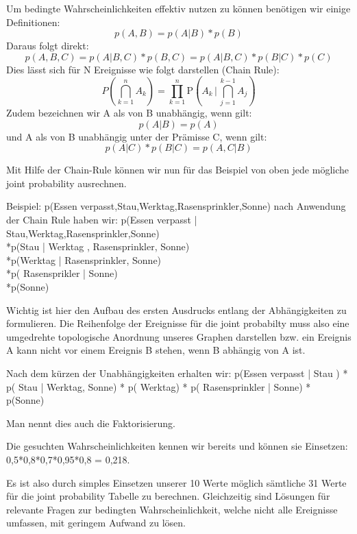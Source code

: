 Um bedingte Wahrscheinlichkeiten effektiv nutzen zu können benötigen wir einige Definitionen:
\begin{equation*}
p(A,B) = p (A | B) * p (B)
\end{equation*}
Daraus folgt direkt:
\begin{equation*}
p(A,B,C) = p(A | B,C)* p(B,C) = p(A | B,C) * p(B | C) *p(C)
\end{equation*}
Dies lässt sich für N Ereignisse wie folgt darstellen (Chain Rule):
\begin{equation*}
    P\left(\bigcap_{k=1}^n A_k\right)  = \prod_{k=1}^n  \mathrm P\left(A_k \,\Bigg|\, \bigcap_{j=1}^{k-1} A_j\right)
\end{equation*}
Zudem bezeichnen wir A als von B unabhängig, wenn gilt:
\begin{equation*}
p(A | B) = p(A)
\end{equation*}
und A als von B unabhängig unter der Prämisse C, wenn gilt:
\begin{equation*}
p(A | C)* p(B | C) = p(A,C | B)
\end{equation*}

Mit Hilfe der Chain-Rule können wir nun für das Beispiel von oben jede mögliche joint probability ausrechnen.

Beispiel:
p(Essen verpasst,Stau,Werktag,Rasensprinkler,Sonne)
nach Anwendung der Chain Rule haben wir:
p(Essen verpasst | Stau,Werktag,Rasensprinkler,Sonne) \\ *p(Stau | Werktag , Rasensprinkler, Sonne) \\ *p(Werktag | Rasensprinkler, Sonne)
\\ *p( Rasensprikler | Sonne)
\\ *p(Sonne)

Wichtig ist hier den Aufbau des ersten Ausdrucks entlang der Abhängigkeiten zu formulieren. Die Reihenfolge der Ereignisse für die joint probabilty muss also eine umgedrehte topologische Anordnung unseres Graphen darstellen bzw. ein Ereignis A kann nicht vor einem Ereignis B stehen, wenn B abhängig von A ist.

Nach dem kürzen der Unabhängigkeiten erhalten wir:
p(Essen verpasst | Stau ) * p( Stau | Werktag, Sonne) * p( Werktag) * p( Rasensprinkler | Sonne) * p(Sonne)

Man nennt dies auch die Faktorisierung.

Die gesuchten Wahrscheinlichkeiten kennen wir bereits und können sie Einsetzen:
0,5*0,8*0,7*0,95*0,8 = 0,218.

Es ist also durch simples Einsetzen unserer 10 Werte möglich sämtliche 31 Werte für die joint probability Tabelle zu berechnen.
Gleichzeitig sind Lösungen für relevante Fragen zur bedingten Wahrscheinlichkeit, welche nicht alle Ereignisse umfassen, mit geringem Aufwand zu lösen.


